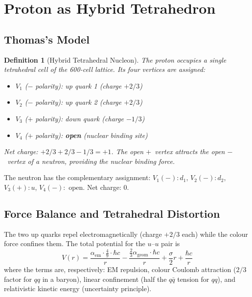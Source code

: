 \documentclass[12pt,a4paper]{article}
\newtheorem{definition}{Definition}
\begin{document}
\section{Proton as Hybrid Tetrahedron}
\label{sec:proton}

\subsection{Thomas's Model}

\begin{definition}[Hybrid Tetrahedral Nucleon]
The proton occupies a single tetrahedral cell of the 600-cell lattice. Its four vertices are assigned:
\begin{itemize}
\item $V_1$ ($-$ polarity): up quark 1 (charge $+2/3$)
\item $V_2$ ($-$ polarity): up quark 2 (charge $+2/3$)
\item $V_3$ ($+$ polarity): down quark (charge $-1/3$)
\item $V_4$ ($+$ polarity): \textbf{open} (nuclear binding site)
\end{itemize}
Net charge: $+2/3 + 2/3 - 1/3 = +1$. The open $+$~vertex attracts the open $-$~vertex of a neutron, providing the nuclear binding force.
\end{definition}

The neutron has the complementary assignment: $V_1(-): d_1$, $V_2(-): d_2$, $V_3(+): u$, $V_4(-):$ open. Net charge: $0$.

\subsection{Force Balance and Tetrahedral Distortion}

The two up quarks repel electromagnetically (charge $+2/3$ each) while the colour force confines them. The total potential for the $u$--$u$ pair is
\begin{equation}
V(r) = \frac{\alpha_{\mathrm{em}} \cdot \frac{4}{9} \cdot \hbar c}{r} - \frac{\frac{2}{3}\alpha_{\mathrm{geom}} \cdot \hbar c}{r} + \frac{\sigma}{2}r + \frac{\hbar c}{r}
\label{eq:potential}
\end{equation}
where the terms are, respectively: EM repulsion, colour Coulomb attraction ($2/3$ factor for $qq$ in a baryon), linear confinement (half the $q\bar{q}$ tension for $qq$), and relativistic kinetic energy (uncertainty principle).
\end{document}
